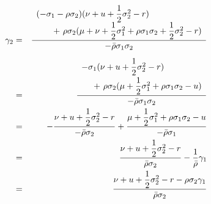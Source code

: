 \documentclass[uplatex,a4j,12pt,dvipdfmx]{jsarticle}
\begin{document}
%
%
\begin{eqnarray*}
	\gamma_{2}
	&=&
	\dfrac{
		\begin{array}{l}
			( - \sigma_{1} - \rho \sigma_{2} )
			( \nu + u + \dfrac{1}{2} \sigma_{2}^{2} - r )
			\\ \hspace{7mm} + \
			\rho \sigma_{2}
			( \mu + \nu + \dfrac{1}{2} \sigma_{1}^{2} + \rho \sigma_{1} \sigma_{2} + \dfrac{1}{2} \sigma_{2}^{2} - r )
		\end{array}
	}
	{ - \bar{\rho} \sigma_{1} \sigma_{2} }
	\\[2mm] &=&
	\dfrac{
		\begin{array}{l}
			- \sigma_{1}
			(  \nu + u + \dfrac{1}{2} \sigma_{2}^{2} - r )
			\\[2mm] \hspace{5mm} + \
			\rho \sigma_{2}
			(\mu + \dfrac{1}{2} \sigma_{1}^{2} + \rho \sigma_{1} \sigma_{2} - u)
		\end{array}
	}
	{ - \bar{\rho} \sigma_{1} \sigma_{2} }
	\\ &=&
	-
	\dfrac{
		\nu + u + \dfrac{1}{2} \sigma_{2}^{2} - r
	}
	{ - \bar{\rho} \sigma_{2} }
	+
	\dfrac{
		\mu + \dfrac{1}{2} \sigma_{1}^{2} + \rho \sigma_{1} \sigma_{2} - u
	}
	{ - \bar{\rho} \sigma_{1} }
	\\ &=&
	\dfrac{
		\nu + u + \dfrac{1}{2} \sigma_{2}^{2} - r
	}
	{ \bar{\rho} \sigma_{2} }
	-
	\dfrac{
		1
	}
	{ \bar{\rho} }
	\gamma_{1}
	\\ &=&
	\dfrac{
		\nu + u + \dfrac{1}{2} \sigma_{2}^{2} - r - \rho \sigma_{2} \gamma_{1}
	}
	{ \bar{\rho} \sigma_{2} }
\end{eqnarray*}
%
%
\end{document}
